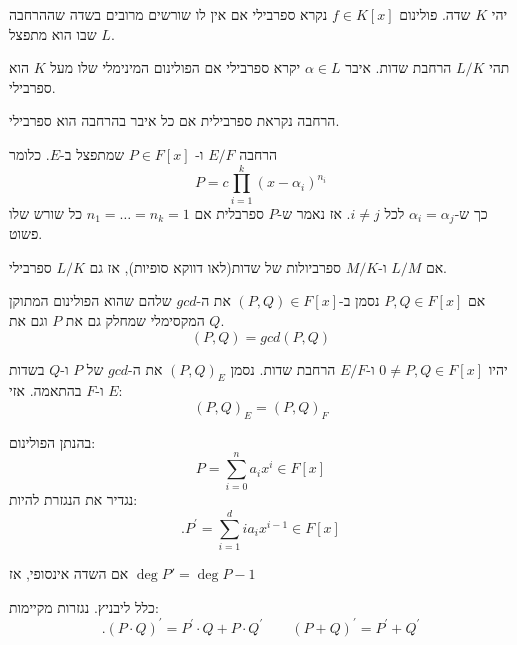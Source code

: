 \documentclass{tstextbook}
\begin{document}
\begin{definition}
יהי \(K\) שדה. פולינום \(f \in K[x]\) נקרא ספרבילי אם אין לו שורשים מרובים בשדה שההרחבה \(L\) שבו הוא מתפצל.

\end{definition}
\begin{definition}
תהי \(L / K\) הרחבת שדות. איבר \(\alpha \in L\) יקרא ספרבילי אם הפולינום המינימלי שלו מעל \(K\) הוא ספרבילי.

\end{definition}
\begin{definition}
הרחבה נקראת ספרבילית אם כל איבר בהרחבה הוא ספרבילי.

\end{definition}
\begin{proposition}
הרחבה \(E / F\) ו- \(P \in F[x]\) שמתפצל ב-\(E\). כלומר
$$P=c \prod_{i=1}^k  \left( x - \alpha _{i} \right)^{n_{i}}$$
כך ש-\(\alpha_{i}=\alpha_{j}\) לכל \(i\neq j\). אז נאמר ש-\(P\) ספרבלית אם \(n_{1}=\dots=n_{k}=1\) כל שורש שלו פשוט.

\end{proposition}
\begin{proposition}
אם \(L / M\) ו-\(M / K\) ספרביולות של שדות(לאו דווקא סופיות), אז גם \(L / K\) ספרבילי.

\end{proposition}
\begin{remark}
אם \(P,Q\in F[x]\) נסמן ב-\((P,Q)\in F[x]\) את ה-\(gcd\) שלהם שהוא הפולינום המתוקן המקסימלי שמחלק גם את \(P\) וגם את \(Q\).
$$(P,Q)=gcd(P,Q)$$

\end{remark}
\begin{lemma}
יהיו \(0 \neq P,Q \in F[x]\) ו-\(E / F\) הרחבת שדות. נסמן \((P,Q)_{E}\) את ה-\(gcd\) של \(P\) ו-\(Q\) בשדות \(E\) ו-\(F\) בהתאמה. אזי:  $$(P,Q)_{E}=(P,Q)_{F}$$

\end{lemma}
\begin{definition}[נגזרת]
בהנתן הפולינום:
$$P=\textstyle\sum_{i=0}^{n}a_{i}x^{i}\in F[x]$$
נגדיר את הנגזרת להיות:
$$.P^{\prime}=\textstyle\sum_{i=1}^{d}i a_{i}x^{i-1}\in F[x]$$

\end{definition}
\begin{remark}
אם השדה אינסופי, אז \(\deg P'=\deg P-1\)

\end{remark}
\begin{lemma}
כלל ליבניץ. נגזרות מקיימות:
$$.\left( P\cdot Q \right)^{\prime}=P^{\prime}\cdot Q+P\cdot Q^{\prime}\qquad (P+Q)^{\prime}=P^{\prime}+Q^{\prime}$$

\end{lemma}
\end{document}
